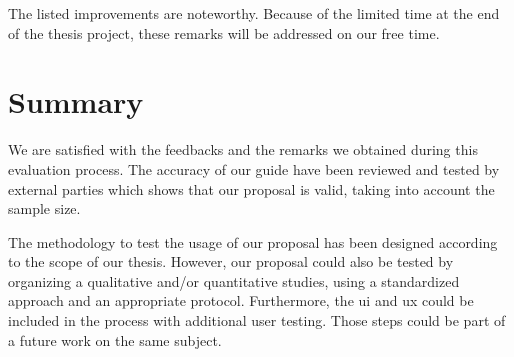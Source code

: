 The listed improvements are noteworthy. Because of the limited time at the end of the thesis project, these remarks will be addressed on our free time.

\section{Summary}
\label{sec:use_summary}

We are satisfied with the feedbacks and the remarks we obtained during this evaluation process. The accuracy of our guide have been reviewed and tested by external parties which shows that our proposal is valid, taking into account the sample size.

The methodology to test the usage of our proposal has been designed according to the scope of our thesis. However, our proposal could also be tested by organizing a qualitative and/or quantitative studies, using a standardized approach and an appropriate protocol. Furthermore, the \gls{ui} and \gls{ux} could be included in the process with additional user testing. Those steps could be part of a future work on the same subject.